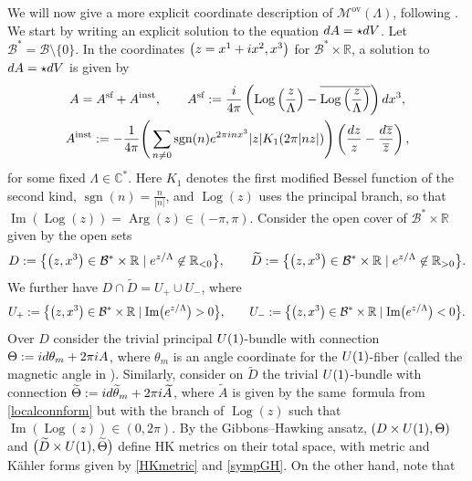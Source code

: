\documentclass[11pt]{article}
\numberwithin{equation}{section}
\numberwithin{equation}{section}
\begin{document}
We will now give a more explicit coordinate description of $\mathcal{M}^{\text{ov}}(\Lambda)$, following \cite[Section~4.1]{GMN1}. We start by writing an explicit solution to the equation ${\rm d}A=\star {\rm d}V$. Let $\mathcal{B}^*=\mathcal{B}\setminus\{0\}$. In the coordinates $\bigl(z=x^1+{\rm i}x^2, x^3\bigr)$ for $\mathcal{B}^*\times \mathbb{R}$, a solution to ${\rm d}A=\star {\rm d}V$ is given by
\begin{gather}
 A=A^{\text{sf}}+A^{\text{inst}},\qquad
 A^{\text{sf}}:=\frac{{\rm i}}{4\pi}\left(\operatorname{Log}\left(\frac{z}{\Lambda}\right)-\overline{\operatorname{Log}\left(\frac{z}{\Lambda}\right)}\right){\rm d}x^3,\nonumber\\
 A^{\text{inst}}:=-\frac{1}{4\pi}\Bigg(\sum_{n\neq 0} \operatorname{sgn}(n){\rm e}^{2\pi {\rm i}nx^3}|z|K_1(2\pi|nz|)\Bigg)\left(\frac{{\rm d}z}{z}-\frac{{\rm d}\overline{z}}{\overline{z}}\right),\label{localconnform}
\end{gather}
for some fixed $\Lambda \in \mathbb{C}^*$. Here $K_1$ denotes the first modified Bessel function of the second kind, $\operatorname{sgn}(n)=\frac{n}{|n|}$, and $\operatorname{Log}(z)$ uses the principal branch, so that $\operatorname{Im}(\operatorname{Log}(z))=\operatorname{Arg}(z)\in(-\pi,\pi)$. Consider the open cover of $\mathcal{B}^*\times \mathbb{R}$ given by the open sets
\begin{equation*}
D:=\bigl\{\bigl(z,x^3\bigr)\in \mathcal{B}^*\times \mathbb{R} \mid {\rm e}^{z/\Lambda}\not\in \mathbb{R}_{<0}\bigr\}, \qquad \widetilde{D}:=\bigl\{\bigl(z,x^3\bigr)\in \mathcal{B}^*\times \mathbb{R} \mid {\rm e}^{z/\Lambda}\not\in \mathbb{R}_{>0}\bigr\}.
\end{equation*}
We further have $D\cap \widetilde{D}=U_{+}\cup U_{-}$, where
\begin{equation*}
 U_{+}:=\bigl\{\bigl(z,x^3\bigr)\in \mathcal{B}^*\times \mathbb{R} \mid \operatorname{Im}\bigl({\rm e}^{z/\Lambda}\bigr)>0\bigr\}, \qquad U_{-}:=\bigl\{\bigl(z,x^3\bigr)\in \mathcal{B}^*\times \mathbb{R} \mid \operatorname{Im}\bigl({\rm e}^{z/\Lambda}\bigr)<0\bigr\}.
\end{equation*}
Over $D$ consider the trivial principal ${\rm U}(1)$-bundle with connection $\Theta:={\rm i}{\rm d}\theta_m +2\pi {\rm i}A$, where $\theta_m$ is an angle coordinate for the ${\rm U}(1)$-fiber (called the magnetic angle in \cite{GMN1}). Similarly, consider on $\widetilde{D}$ the trivial ${\rm U}(1)$-bundle with connection $\widetilde{\Theta}:={\rm i}{\rm d}\widetilde{\theta}_m+ 2\pi {\rm i}\widetilde{A}$, where $\widetilde{A}$ is given by the same~formula from \eqref{localconnform} but with the branch of $\operatorname{Log}(z)$ such that $\operatorname{Im}(\operatorname{Log}(z))\in (0,2\pi)$. By the Gibbons--Hawking ansatz, $(D\times {\rm U}(1),\Theta)$ and $\bigl(\widetilde{D}\times {\rm U}(1), \widetilde{\Theta}\bigr)$ define HK metrics on their total space, with metric and K\"ahler forms given by \eqref{HKmetric} and \eqref{sympGH}. On the other hand, note that
\end{document}
